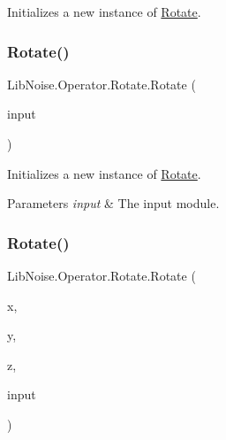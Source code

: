 Initializes a new instance of \hyperlink{class_lib_noise_1_1_operator_1_1_rotate}{Rotate}. 

\mbox{\label{class_lib_noise_1_1_operator_1_1_rotate_a4f186a991d0d441e75e5b1949612d015}} 
\subsubsection{\texorpdfstring{Rotate()}{Rotate()}\hspace{0.1cm}{\footnotesize\ttfamily [2/3]}}
{\footnotesize\ttfamily Lib\+Noise.\+Operator.\+Rotate.\+Rotate (\begin{DoxyParamCaption}\item[{\hyperlink{class_lib_noise_1_1_module_base}{Module\+Base}}]{input }\end{DoxyParamCaption})}



Initializes a new instance of \hyperlink{class_lib_noise_1_1_operator_1_1_rotate}{Rotate}. 


\begin{DoxyParams}{Parameters}
{\em input} & The input module.\\
\hline
\end{DoxyParams}
\mbox{\label{class_lib_noise_1_1_operator_1_1_rotate_a00ab23e9d490497307a9a2927b9285ef}} 
\subsubsection{\texorpdfstring{Rotate()}{Rotate()}\hspace{0.1cm}{\footnotesize\ttfamily [3/3]}}
{\footnotesize\ttfamily Lib\+Noise.\+Operator.\+Rotate.\+Rotate (\begin{DoxyParamCaption}\item[{double}]{x,  }\item[{double}]{y,  }\item[{double}]{z,  }\item[{\hyperlink{class_lib_noise_1_1_module_base}{Module\+Base}}]{input }\end{DoxyParamCaption})}



